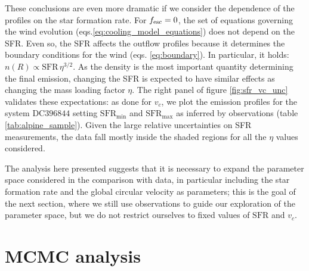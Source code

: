 These conclusions are even more dramatic if we consider the dependence of the \CII profiles on the star formation rate. For $f_{\rm esc} = 0$, the set of equations governing the wind evolution (eqs.\ref{eq:cooling_model_equations}) does not depend on the SFR. Even so, the SFR affects the outflow profiles because it determines the boundary conditions for the wind (eqs. \ref{eq:boundary}).
%
In particular, it holds: $n(R) \propto \mathrm{SFR}\,\eta^{3/2}$. As the density is the most important quantity determining the final \CII emission, changing the SFR is expected to have similar effects as changing the mass loading factor $\eta$. The right panel of figure \ref{fig:sfr_vc_unc} validates these expectations: as done for $v_c$, we plot the \CII emission profiles for the system DC$396844$ setting $\mathrm{SFR}_\mathrm{min}$ and $\mathrm{SFR}_\mathrm{max}$ as inferred by observations (table \ref{tab:alpine_sample}). Given the large relative uncertainties on SFR measurements, the data fall mostly inside the shaded regions for all the $\eta$ values considered. 

The analysis here presented suggests that it is necessary to expand the parameter space considered in the comparison with data, in particular including the star formation rate and the global circular velocity as parameters; this is the goal of the next section, where we still use observations to guide our exploration of the parameter space, but we do not restrict ourselves to fixed values of $\mathrm{SFR}$ and $v_c$.

\section{MCMC analysis} \label{sec:mcmc}

